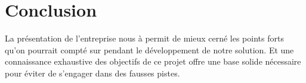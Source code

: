 \section{Conclusion} 

La présentation de l'entreprise nous à permit de mieux cerné les points
forts qu'on pourrait compté sur pendant le développement de notre
solution. Et une connaissance exhaustive des objectifs de ce projet
offre une base solide nécessaire pour éviter de s’engager dans des
fausses pistes.
